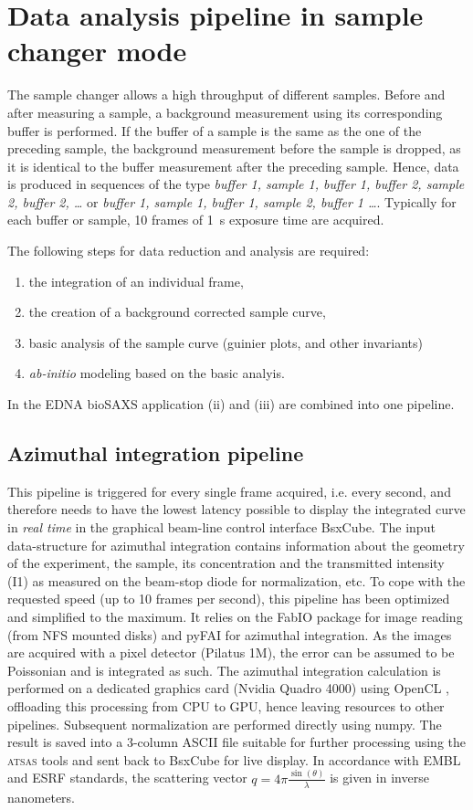 \documentclass[preprint,pdf]{iucr}              %
\begin{document}
\section{Data analysis pipeline in sample changer mode}

The sample changer allows a high throughput of different samples.
Before and after measuring a sample, a background measurement using its
corresponding buffer is performed.
If the buffer of a sample is the same as the one of the preceding sample, the
background measurement before the sample is dropped, as it is identical to the
buffer measurement after the preceding sample.
Hence, data is produced in sequences of the type \textit{buffer 1, sample 1,
buffer 1, buffer 2, sample 2, buffer 2, \ldots}  or  \textit{buffer 1, sample 1,
buffer 1,  sample 2, buffer 1 \ldots}.
Typically for each buffer or sample, 10 frames of 1~s exposure time are acquired.

The following steps for data reduction and analysis are required:
\begin{enumerate}
\item the integration of an individual frame,
\item the creation of a background corrected sample curve,
\item basic analysis of the sample curve (guinier plots, and other invariants)
\item \textit{ab-initio} modeling based on the basic analyis.
\end{enumerate}
In the EDNA bioSAXS application (ii) and (iii) are combined into one pipeline.

\subsection{Azimuthal integration pipeline}
\label{AI}
This pipeline is triggered for every single frame acquired, i.e. every second,
and therefore needs to have the lowest latency possible to display the integrated curve
in \textit{real time} in the graphical beam-line control interface BsxCube.
The input data-structure for azimuthal integration contains
information about the geometry of the experiment, the sample, its concentration
and the transmitted intensity (I1) as measured on the beam-stop diode for
normalization, etc.
To cope with the requested speed (up to 10 frames per second), this pipeline
has been optimized and simplified to the maximum.
It relies on the FabIO\cite{fabio} package for image reading (from NFS mounted disks) and
pyFAI\cite{pyFAI} for azimuthal integration.
As the images are acquired with a pixel detector (Pilatus 1M), the error can be
assumed to be Poissonian and is integrated as such.
The azimuthal integration calculation is performed on a dedicated graphics card
(Nvidia Quadro 4000) using OpenCL \cite{pyFAI_gpu}, offloading this processing
from CPU to GPU, hence leaving resources to other pipelines.
Subsequent normalization are performed directly using numpy\cite{numpy}.
The result is saved into a 3-column ASCII file suitable for further processing
using the \textsc{atsas} tools\cite{ATSAS1} and sent back to BsxCube for
live display.
In accordance with EMBL and ESRF standards, the scattering vector
$q=4\pi\frac{\sin(\theta)}{\lambda}$ is given in inverse nanometers.
\end{document}
